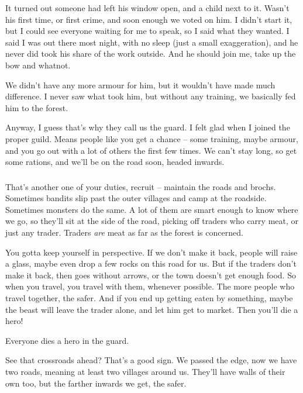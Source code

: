 \begin{multicols}{2}
\begin{exampletext}
  It turned out someone had left his window open, and a child next to it.
  Wasn't his first time, or first crime, and soon enough we voted on him.
  I didn't start it, but I could see everyone waiting for me to speak, so I said what they wanted.
  I said I was out there most night, with no sleep (just a small exaggeration), and he never did took his share of the work outside.
  And he should join me, take up the bow and whatnot.

  We didn't have any more armour for him, but it wouldn't have made much difference.
  I never saw what took him, but without any training, we basically fed him to the forest.
  
  Anyway, I guess that's why they call us the \gls{guard}.
  I felt glad when I joined the proper guild.
  Means people like you get a chance -- some training, maybe armour, and you go out with a lot of others the first few times.
  We can't stay long, so get some rations, and we'll be on the road soon, headed inwards.

  \subsubsection*{}

  That's another one of your duties, recruit -- maintain the roads and \glspl{broch}.
  Sometimes bandits slip past the outer \glspl{village} and camp at the roadside.
  Sometimes monsters do the same.
  A lot of them are smart enough to know where we go, so they'll sit at the side of the road, picking off traders who carry meat, or just any trader.
  Traders \emph{are} meat as far as the forest is concerned.

  You gotta keep yourself in perspective.
  If we don't make it back, people will raise a glass, maybe even drop a few rocks on this road for us.
  But if the traders don't make it back, then  goes without arrows, or the town doesn't get enough food.
  So when you travel, you travel with them, whenever possible.
  The more people who travel together, the safer.
  And if you end up getting eaten by something, maybe the beast will leave the trader alone, and let him get to market.
  Then you'll die a hero!

  Everyone dies a hero in the \gls{guard}.

  See that crossroads ahead?
  That's a good sign.
  We passed the \gls{edge}, now we have two roads, meaning at least two \glspl{village} around us.
  They'll have walls of their own too, but the farther inwards we get, the safer.


\end{exampletext}
\end{multicols}
